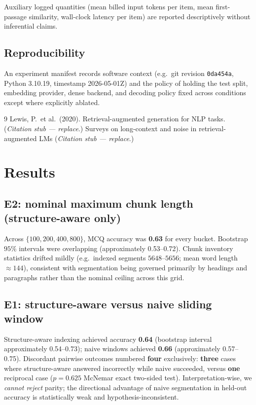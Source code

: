 \documentclass[11pt,a4paper]{article}
\begin{document}
Auxiliary logged quantities (mean billed input tokens per item, mean first-passage similarity, wall-clock latency per item) are reported descriptively without inferential claims.

\subsection{Reproducibility}
An experiment manifest records software context (e.g.\ git revision \texttt{0da454a}, Python 3.10.19, timestamp 2026-05-01Z) and the policy of holding the test split, embedding provider, dense backend, and decoding policy fixed across conditions except where explicitly ablated.

\begin{thebibliography}{9}
   Lewis, P.\ et al.\ (2020). Retrieval-augmented generation for NLP tasks. (\emph{Citation stub --- replace}.)
   Surveys on long-context and noise in retrieval-augmented LMs (\emph{Citation stub --- replace}.)
\end{thebibliography}

\section{Results}

\subsection*{E2: nominal maximum chunk length (structure-aware only)}
Across \(\{100,200,400,800\}\), MCQ accuracy was \textbf{0.63} for every bucket. Bootstrap \(95\%\) intervals were overlapping (approximately 0.53--0.72). Chunk inventory statistics drifted mildly (e.g.\ indexed segments \(5648\)--\(5656\); mean word length \(\approx 144\)), consistent with segmentation being governed primarily by headings and paragraphs rather than the nominal ceiling across this grid.

\subsection*{E1: structure-aware versus naive sliding window}
Structure-aware indexing achieved accuracy \textbf{0.64} (bootstrap interval approximately 0.54--0.73); naive windows achieved \textbf{0.66} (approximately 0.57--0.75). Discordant pairwise outcomes numbered \textbf{four} exclusively: \textbf{three} cases where structure-aware answered incorrectly while naive succeeded, versus \textbf{one} reciprocal case (\(p = 0.625\) McNemar exact two-sided test). Interpretation-wise, we \emph{cannot reject} parity; the directional advantage of naive segmentation in held-out accuracy is statistically weak and hypothesis-inconsistent.
\end{document}
